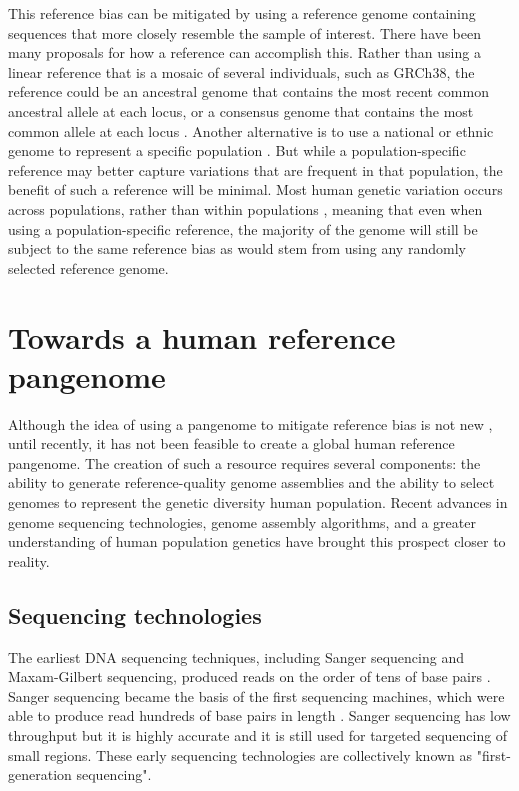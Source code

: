\documentclass[11pt]{ucscthesis}
\begin{document}
This reference bias can be mitigated by using a reference genome containing sequences that more closely resemble the sample of interest.
There have been many proposals for how a reference can accomplish this.
Rather than using a linear reference that is a mosaic of several individuals, such as GRCh38, the reference could be an ancestral genome that contains the most recent common ancestral allele at each locus, or a consensus genome that contains the most common allele at each locus \cite{ballouz_is_2019}.
Another alternative is to use a national or ethnic genome to represent a specific population \cite{ballouz_is_2019,chinese_national_genome_2023,korean_national_genome_2016,vietnamese_national_genome_2015,danish_national_genome_2015,swedish_national_genome_2018,kowal_race_2019}.
But while a population-specific reference may better capture variations that are frequent in that population, the benefit of such a reference will be minimal.
Most human genetic variation occurs across populations, rather than within populations \cite{nih_understanding_2007}, meaning that even when using a population-specific reference, the majority of the genome will still be subject to the same reference bias as would stem from using any randomly selected reference genome. 

\section{Towards a human reference pangenome}

Although the idea of using a pangenome to mitigate reference bias is not new \cite{li_building_2010}, until recently, it has not been feasible to create a global human reference pangenome.
The creation of such a resource requires several components: the ability to generate reference-quality genome assemblies and the ability to select genomes to represent the genetic diversity human population.
Recent advances in genome sequencing technologies, genome assembly algorithms, and a greater understanding of human population genetics have brought this prospect closer to reality.

\subsection{Sequencing technologies}
\label{sec:background:sequencing}

The earliest DNA sequencing techniques, including Sanger sequencing and Maxam-Gilbert sequencing, produced reads on the order of tens of base pairs \cite{sanger_sequencing_1975,sanger_sequencing_1977,maxam_sequencing_1980}.
Sanger sequencing became the basis of the first sequencing machines, which were able to produce read hundreds of base pairs in length \cite{sequencing_review_2016}.
Sanger sequencing has low throughput but it is highly accurate and it is still used for targeted sequencing of small regions.
These early sequencing technologies are collectively known as "first-generation sequencing".
\end{document}
